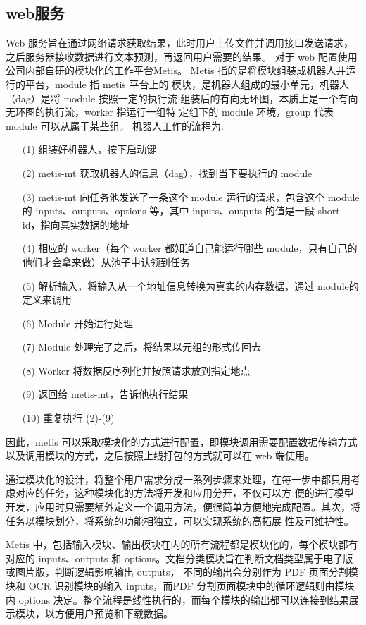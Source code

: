 \subsection{web服务}

Web 服务旨在通过网络请求获取结果，此时用户上传文件并调用接口发送请求，之后服务器接收数据进行文本预测，再返回用户需要的结果。
对于 web 配置使用公司内部自研的模块化的工作平台Metis。
Metis 指的是将模块组装成机器人并运行的平台，module 指 metis 平台上的
模块，是机器人组成的最小单元，机器人（dag）是将 module 按照一定的执行流
组装后的有向无环图，本质上是一个有向无环图的执行流，worker 指运行一组特
定组下的 module 环境，group 代表 module 可以从属于某些组。
机器人工作的流程为:

\begin{enumerate}
    \item[(1)] 组装好机器人，按下启动键
    \item[(2)] metis-mt 获取机器人的信息（dag），找到当下要执行的 module
    \item[(3)] metis-mt 向任务池发送了一条这个 module 运行的请求，包含这个 module的 inputs、outputs、options 等，其中 inputs、outputs 的值是一段 short-id，指向真实数据的地址
    \item[(4)] 相应的 worker（每个 worker 都知道自己能运行哪些 module，只有自己的他们才会拿来做）从池子中认领到任务
    \item[(5)] 解析输入，将输入从一个地址信息转换为真实的内存数据，通过 module的定义来调用
    \item[(6)] Module 开始进行处理
    \item[(7)] Module 处理完了之后，将结果以元组的形式传回去
    \item[(8)] Worker 将数据反序列化并按照请求放到指定地点
    \item[(9)] 返回给 metis-mt，告诉他执行结果
    \item[(10)] 重复执行 (2)-(9)
\end{enumerate}


因此，metis 可以采取模块化的方式进行配置，即模块调用需要配置数据传输方式以及调用模块的方式，之后按照上线打包的方式就可以在 web 端使用。

通过模块化的设计，将整个用户需求分成一系列步骤来处理，在每一步中都只用考虑对应的任务，这种模块化的方法将开发和应用分开，不仅可以方
便的进行模型开发，应用时只需要额外定义一个调用方法，便很简单方便地完成配置。其次，将任务以模块划分，将系统的功能相独立，可以实现系统的高拓展
性及可维护性。

Metis 中，包括输入模块、输出模块在内的所有流程都是模块化的，每个模块都有对应的 inputs、outputs 和 options。文档分类模块旨在判断文档类型属于电子版或图片版，判断逻辑影响输出 outputs，
不同的输出会分别作为 PDF 页面分割模块和 OCR 识别模块的输入 inputs，而PDF 分割页面模块中的循环逻辑则由模块内 options 决定。整个流程是线性执行的，而每个模块的输出都可以连接到结果展示模块，以方便用户预览和下载数据。

